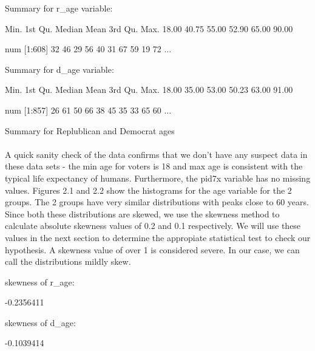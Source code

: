 \documentclass[12pt]{article}
\begin{document}
\begin{table}[H]
\begin{Schunk}
\begin{Soutput}
Summary for r_age variable:
\end{Soutput}
\begin{Soutput}
   Min. 1st Qu.  Median    Mean 3rd Qu.    Max. 
  18.00   40.75   55.00   52.90   65.00   90.00 
\end{Soutput}
\begin{Soutput}
 num [1:608] 32 46 29 56 40 31 67 59 19 72 ...
\end{Soutput}
\begin{Soutput}
Summary for d_age variable:
\end{Soutput}
\begin{Soutput}
   Min. 1st Qu.  Median    Mean 3rd Qu.    Max. 
  18.00   35.00   53.00   50.23   63.00   91.00 
\end{Soutput}
\begin{Soutput}
 num [1:857] 26 61 50 66 38 45 35 33 65 60 ...
\end{Soutput}
\end{Schunk}
\caption{Summary for Replublican and Democrat ages}
\end{table}

\paragraph{}
A quick sanity check of the data confirms that we don't have any suspect data in these data sets - the min age for voters is 18 and max age is consistent with the typical life expectancy of humans. Furthermore, the pid7x variable has no missing values. Figures 2.1 and 2.2 show the histograms for the age variable for the 2 groups. The 2 groups have very similar distributions with peaks close to 60 years. Since both these distributions are skewed, we use the skewness method to calculate absolute skewness values of 0.2 and 0.1 respectively. We will use these values in the next section to determine the appropiate statistical test to check our hypothesis. A skewness value of over 1 is considered severe. In our case, we can call the distributions mildly skew.

\begin{table}[H]
\begin{Schunk}
\begin{Soutput}
skewness of r_age: 
\end{Soutput}
\begin{Soutput}
[1] -0.2356411
\end{Soutput}
\begin{Soutput}
skewness of d_age: 
\end{Soutput}
\begin{Soutput}
[1] -0.1039414
\end{Soutput}
\end{Schunk}
\end{table}
\end{document}
